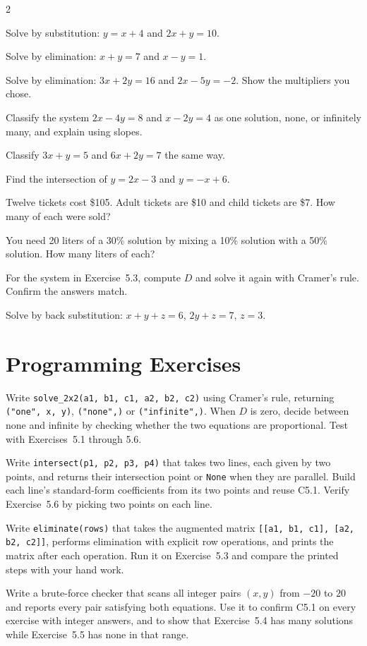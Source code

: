 \begin{multicols}{2}
\begin{exercises}
\item Solve by substitution: $y = x + 4$ and $2x + y = 10$.
\item Solve by elimination: $x + y = 7$ and $x - y = 1$.
\item Solve by elimination: $3x + 2y = 16$ and $2x - 5y = -2$. Show the multipliers you chose.
\item Classify the system $2x - 4y = 8$ and $x - 2y = 4$ as one solution, none, or infinitely many, and explain using slopes.
\item Classify $3x + y = 5$ and $6x + 2y = 7$ the same way.
\item Find the intersection of $y = 2x - 3$ and $y = -x + 6$.
\item Twelve tickets cost \$105. Adult tickets are \$10 and child tickets are \$7. How many of each were sold?
\item You need 20 liters of a 30\% solution by mixing a 10\% solution with a 50\% solution. How many liters of each?
\item For the system in Exercise~5.3, compute $D$ and solve it again with Cramer's rule. Confirm the answers match.
\item Solve by back substitution: $x + y + z = 6$, $2y + z = 7$, $z = 3$.
\end{exercises}
\end{multicols}

\section{Programming Exercises}

\begin{codeexercises}
\item Write \lstinline!solve_2x2(a1, b1, c1, a2, b2, c2)! using Cramer's rule, returning \lstinline!("one", x, y)!, \lstinline!("none",)! or \lstinline!("infinite",)!. When $D$ is zero, decide between none and infinite by checking whether the two equations are proportional. Test with Exercises~5.1 through 5.6.
\item Write \lstinline!intersect(p1, p2, p3, p4)! that takes two lines, each given by two points, and returns their intersection point or \lstinline!None! when they are parallel. Build each line's standard-form coefficients from its two points and reuse C5.1. Verify Exercise~5.6 by picking two points on each line.
\item Write \lstinline!eliminate(rows)! that takes the augmented matrix \lstinline![[a1, b1, c1], [a2, b2, c2]]!, performs elimination with explicit row operations, and prints the matrix after each operation. Run it on Exercise~5.3 and compare the printed steps with your hand work.
\item Write a brute-force checker that scans all integer pairs $(x, y)$ from $-20$ to $20$ and reports every pair satisfying both equations. Use it to confirm C5.1 on every exercise with integer answers, and to show that Exercise~5.4 has many solutions while Exercise~5.5 has none in that range.
\end{codeexercises}
